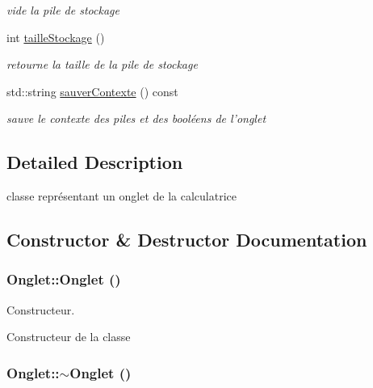 \begin{DoxyCompactItemize}
\begin{DoxyCompactList}\small\item\em vide la pile de stockage \item\end{DoxyCompactList}\item 
\hypertarget{classOnglet_aa7811fa3572fac722be99b38ba3c3500}{
int \hyperlink{classOnglet_aa7811fa3572fac722be99b38ba3c3500}{tailleStockage} ()}
\label{classOnglet_aa7811fa3572fac722be99b38ba3c3500}

\begin{DoxyCompactList}\small\item\em retourne la taille de la pile de stockage \item\end{DoxyCompactList}\item 
\hypertarget{classOnglet_a076527a42ad44fd9fc1d9e0fe0e846e0}{
std::string \hyperlink{classOnglet_a076527a42ad44fd9fc1d9e0fe0e846e0}{sauverContexte} () const }
\label{classOnglet_a076527a42ad44fd9fc1d9e0fe0e846e0}

\begin{DoxyCompactList}\small\item\em sauve le contexte des piles et des booléens de l'onglet \item\end{DoxyCompactList}\end{DoxyCompactItemize}


\subsection{Detailed Description}
classe représentant un onglet de la calculatrice 

\subsection{Constructor \& Destructor Documentation}
\hypertarget{classOnglet_ad0388b0a300edfeab063166f4fa44e25}{
\subsubsection[{Onglet}]{\setlength{\rightskip}{0pt plus 5cm}Onglet::Onglet ()}}
\label{classOnglet_ad0388b0a300edfeab063166f4fa44e25}


Constructeur. 

Constructeur de la classe \hypertarget{classOnglet_a717d9bd0139081b4e779f552c835b0f5}{
\subsubsection[{$\sim$Onglet}]{\setlength{\rightskip}{0pt plus 5cm}Onglet::$\sim$Onglet ()}}
\label{classOnglet_a717d9bd0139081b4e779f552c835b0f5}


